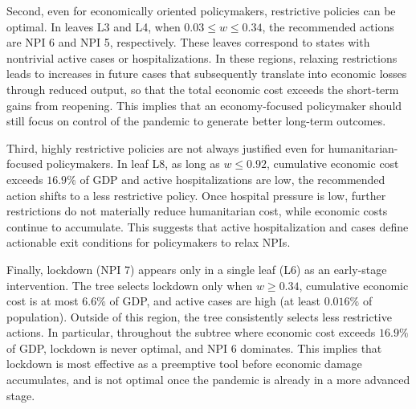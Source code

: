 \documentclass[msom,blindrev]{informs3} %
\begin{document}
{Second, even for economically oriented policymakers, restrictive policies can be optimal. In leaves L3 and L4, when $0.03 \leq w \leq 0.34$, the recommended actions are NPI 6 and NPI 5, respectively. These leaves correspond to states with nontrivial active cases or hospitalizations. In these regions, relaxing restrictions leads to increases in future cases that subsequently translate into economic losses through reduced output, so that the total economic cost exceeds the short-term gains from reopening. This implies that an economy-focused policymaker should still focus on control of the pandemic to generate better long-term outcomes.

Third, highly restrictive policies are not always justified even for humanitarian-focused policymakers. In leaf L8, as long as $w \leq 0.92$, cumulative economic cost exceeds $16.9\%$ of GDP and active hospitalizations are low, the recommended action shifts to a less restrictive policy. Once hospital pressure is low, further restrictions do not materially reduce humanitarian cost, while economic costs continue to accumulate. This suggests that active hospitalization and cases define actionable exit conditions for policymakers to relax NPIs.

Finally, lockdown (NPI 7) appears only in a single leaf (L6) as an early-stage intervention. The tree selects lockdown only when $w \geq 0.34$, cumulative economic cost is at most $6.6\%$ of GDP, and active cases are high (at least $0.016\%$ of population). Outside of this region, the tree consistently selects less restrictive actions. In particular, throughout the subtree where economic cost exceeds $16.9\%$ of GDP, lockdown is never optimal, and NPI 6 dominates. This implies that lockdown is most effective as a preemptive tool before economic damage accumulates, and is not optimal once the pandemic is already in a more advanced stage.

}
\end{document}
